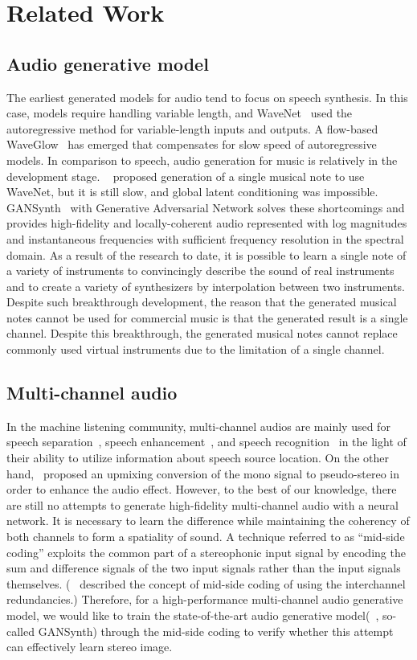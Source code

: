 \section{Related Work}
\label{sec:related_work}
\subsection{Audio generative model}
The earliest generated models for audio tend to focus on speech synthesis. In this case, models require handling variable length, and WaveNet~\cite{wavenet} used the autoregressive method for variable-length inputs and outputs. A flow-based WaveGlow~\cite{waveglow} has emerged that compensates for slow speed of autoregressive models. In comparison to speech, audio generation for music is relatively in the development stage. ~\cite{nsynth} proposed generation of a single musical note to use WaveNet, but it is still slow, and global latent conditioning was impossible. GANSynth~\cite{gansynth} with Generative Adversarial Network solves these shortcomings and provides high-fidelity and locally-coherent audio represented with log magnitudes and instantaneous frequencies with sufficient frequency resolution in the spectral domain. As a result of the research to date, it is possible to learn a single note of a variety of instruments to convincingly describe the sound of real instruments and to create a variety of synthesizers by interpolation between two instruments. Despite such breakthrough development, the reason that the generated musical notes cannot be used for commercial music is that the generated result is a single channel. Despite this breakthrough, the generated musical notes cannot replace commonly used virtual instruments due to the limitation of a single channel.

\subsection{Multi-channel audio}

In the machine listening community, multi-channel audios are mainly used for speech separation~\cite{multi_ch_sourcesep}, speech enhancement~\cite{speech_enh}, and speech recognition~\cite{speech_recog} in the light of their ability to utilize information about speech source location. On the other hand,~\cite{upmix} proposed an upmixing conversion of the mono signal to pseudo-stereo in order to enhance the audio effect. However, to the best of our knowledge, there are still no attempts to generate high-fidelity multi-channel audio with a neural network. It is necessary to learn the difference while maintaining the coherency of both channels to form a spatiality of sound. A technique referred to as “mid-side coding” exploits the common part of a stereophonic input signal by encoding the sum and difference signals of the two input signals rather than the input signals themselves. (~\cite{mscoding} described the concept of mid-side coding of using the interchannel redundancies.) Therefore, for a high-performance multi-channel audio generative model, we would like to train the state-of-the-art audio generative model(~\cite{gansynth}, so-called GANSynth) through the mid-side coding to verify whether this attempt can effectively learn stereo image.